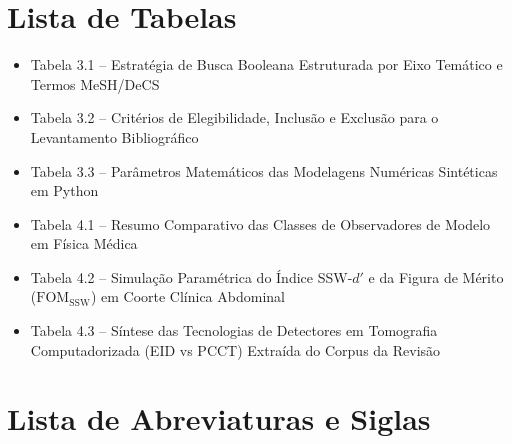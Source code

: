 \documentclass[
  12pt,
  a4paper,
  oneside
]{report}
\begin{document}
\clearpage

\chapter*{Lista de Tabelas}
\begin{itemize}[leftmargin=*,label={}]
  \item Tabela 3.1 -- Estratégia de Busca Booleana Estruturada por Eixo Temático e Termos MeSH/DeCS 
  \item Tabela 3.2 -- Critérios de Elegibilidade, Inclusão e Exclusão para o Levantamento Bibliográfico 
  \item Tabela 3.3 -- Parâmetros Matemáticos das Modelagens Numéricas Sintéticas em Python 
  \item Tabela 4.1 -- Resumo Comparativo das Classes de Observadores de Modelo em Física Médica 
  \item Tabela 4.2 -- Simulação Paramétrica do Índice SSW-$d'$ e da Figura de Mérito ($\text{FOM}_{\text{SSW}}$) em Coorte Clínica Abdominal 
  \item Tabela 4.3 -- Síntese das Tecnologias de Detectores em Tomografia Computadorizada (EID vs PCCT) Extraída do Corpus da Revisão 
\end{itemize}
\clearpage

\chapter*{Lista de Abreviaturas e Siglas}
\end{document}

